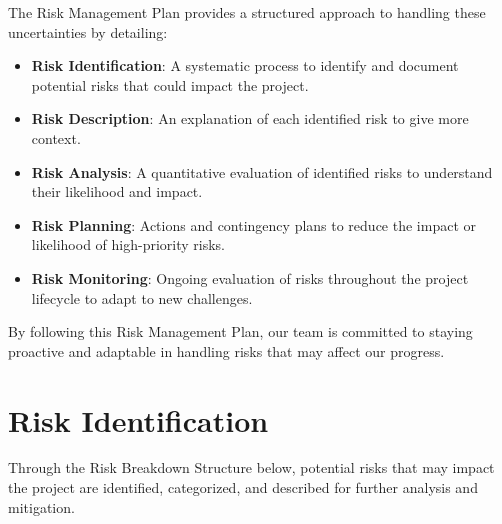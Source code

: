 The Risk Management Plan provides a structured approach to handling these uncertainties by detailing:
\begin{itemize}
    \item \textbf{Risk Identification}: A systematic process to identify and document potential risks that could impact the project.
    \item \textbf{Risk Description}: An explanation of each identified risk to give more context.
    \item \textbf{Risk Analysis}: A quantitative evaluation of identified risks to understand their likelihood and impact.
    \item \textbf{Risk Planning}: Actions and contingency plans to reduce the impact or likelihood of high-priority risks.
    \item \textbf{Risk Monitoring}: Ongoing evaluation of risks throughout the project lifecycle to adapt to new challenges.
\end{itemize}

\tableofcontents

By following this Risk Management Plan, our team is committed to staying proactive and adaptable in handling risks that may affect our progress.
\pagebreak


\section{Risk Identification}

Through the Risk Breakdown Structure below, potential risks that may impact the project are identified, categorized, and described for further analysis and mitigation.

